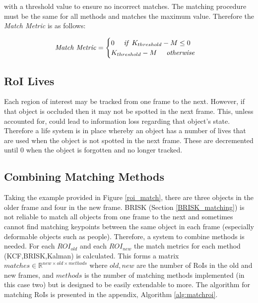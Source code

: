 \documentclass[11pt,twoside]{report}
\begin{document}
with a threshold value to ensure no incorrect matches. The matching procedure must be the same for all methods and matches the maximum value. Therefore the \textit{Match Metric} is as follows:

\begin{equation}
\begin{aligned}
\textnormal{\textit{Match Metric}} = 
\begin{cases}
0 \quad \textnormal{\textit{ if }} K_{threshold}-M \leq 0 \\
K_{threshold}-M \quad \textnormal{\textit{ otherwise}}
\end{cases}
\end{aligned}
\end{equation}


\subsection{RoI Lives}
Each region of interest may be tracked from one frame to the next. However, if that object is occluded then it may not be spotted in the next frame. This, unless accounted for, could lead to information loss regarding that object's state. Therefore a life system is in place whereby an object has a number of lives that are used when the object is not spotted in the next frame. These are decremented until 0 when the object is forgotten and no longer tracked.  


\subsection{Combining Matching Methods} \label{matching_combining_methods}
Taking the example provided in Figure \ref{roi_match}, there are three objects in the older frame and four in the new frame. BRISK (Section \ref{BRISK_matching}) is not reliable to match all objects from one frame to the next and sometimes cannot find matching keypoints between the same object in each frame (especially deformable objects such as people). Therefore, a system to combine methods is needed. For each $ROI_{old}$ and each $ROI_{new}$ the match metrics for each method (KCF,BRISK,Kalman) is calculated. This forms a matrix $matches \in \mathbb{R}^{new \times old \times methods}$ where $old,new$ are the number of RoIs in the old and new frames, and 
$methods$ is the number of matching methods implemented (in this case two) but is designed to be easily extendable to more. The algorithm for matching RoIs is presented in the appendix, Algorithm \ref{alg:matchroi}.
\newline
\end{document}
